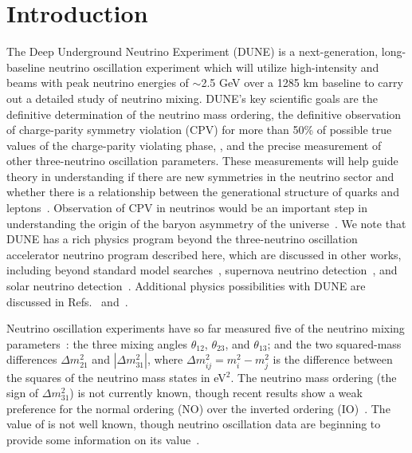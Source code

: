 \section{Introduction}
\label{sec:intro}

The Deep Underground Neutrino Experiment (DUNE) is a next-generation, long-baseline neutrino oscillation experiment which will utilize high-intensity \numu and \anumu beams with peak neutrino energies of $\sim$2.5 GeV over a 1285 km baseline to carry out a detailed study of neutrino mixing. DUNE's key scientific goals are the definitive determination of the neutrino mass ordering, the definitive observation of charge-parity symmetry violation (CPV) for more than 50\% of possible true values of the charge-parity violating phase, \deltacp, and the precise measurement of other three-neutrino oscillation parameters.
These measurements will help guide theory in understanding if there are new symmetries in the neutrino sector and whether there is a relationship between the generational structure of quarks and leptons~\cite{Qian:2015waa}. Observation of CPV in neutrinos would be an important step in understanding the origin of the baryon asymmetry of the universe~\cite{Fukugita:1986hr, Davidson:2008bu}. We note that DUNE has a rich physics program beyond the three-neutrino oscillation accelerator neutrino program described here, which are discussed in other works, including beyond standard model searches~\cite{Abi:2020kei}, supernova neutrino detection~\cite{Abi:2020lpk}, and solar neutrino detection~\cite{Capozzi:2018dat}. Additional physics possibilities with DUNE are discussed in Refs.~\cite{Abi:2020evt} and~\cite{AbedAbud:2021hpb}.

Neutrino oscillation experiments have so far measured five of the neutrino mixing parameters~\cite{Capozzi:2017ipn,deSalas:2020pgw,Esteban:2020cvm}: the three mixing angles $\theta_{12}$, $\theta_{23}$, and $\theta_{13}$; and the two squared-mass differences $\Delta m^{2}_{21}$ and $|\Delta m^{2}_{31}|$, where $\Delta m^2_{ij} = m^2_{i} - m^{2}_{j}$ is the difference between the squares of the neutrino mass states in eV$^{2}$.
The neutrino mass ordering (the sign of $\Delta m^{2}_{31}$) is not currently known, though recent results show a weak preference for the normal ordering (NO) over the inverted ordering (IO)~\cite{Abe:2021gky,PhysRevD.97.072001,PhysRevLett.123.151803}.
The value of \deltacp is not well known, though neutrino oscillation data are beginning to provide some information on its value~\cite{Abe:2019vii,Abe:2021gky}.

